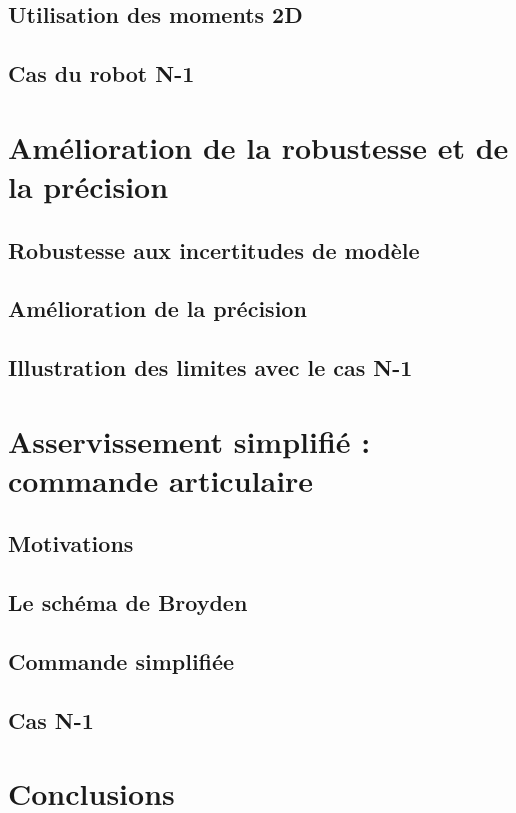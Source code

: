 \subsection{Utilisation des moments 2D}

\subsection{Cas du robot N-1}

\section{Amélioration de la robustesse et de la précision}

\subsection{Robustesse aux incertitudes de modèle}

\subsection{Amélioration de la précision}

\subsection{Illustration des limites avec le cas N-1}


\section{Asservissement simplifié : commande articulaire}

\subsection{Motivations}

\subsection{Le schéma de Broyden}

\subsection{Commande simplifiée}

\subsection{Cas N-1}

\section{Conclusions}